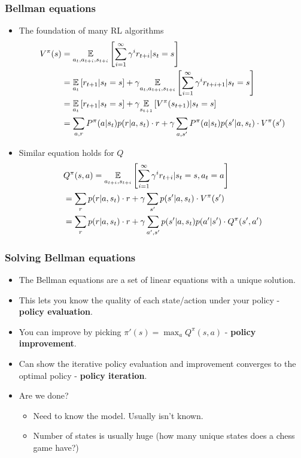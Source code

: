 \documentclass{beamer}
\renewcommand{\high}{\textbf}
\begin{document}
\begin{frame}\frametitle{Bellman equations}\small
\begin{itemize}
    \item The foundation of many RL algorithms
    {\footnotesize
    \begin{align*}\footnotesize
    V^\pi(s)&=\underset{a_{t},a_{t+i},s_{t+i}}{\mathbb{E}}\left[\sum_{i=1}^\infty\gamma^{i} r_{t+i} |s_t=s\right] \\
    &=\underset{a_{t}}{\mathbb{E}}\left[r_{t+1} |s_t=s\right]  +\gamma \underset{a_{t},a_{t+i},s_{t+i}}{\mathbb{E}}\left[\sum_{i=1}^\infty\gamma^{i} r_{t+i+1} |s_t=s\right] \\
    & = \underset{a_{t}}{\mathbb{E}}\left[r_{t+1} |s_t=s\right] +\gamma \underset{s_{t+1}}{\mathbb{E}}\left[V^{\pi}(s_{t+1})|s_t=s\right] \\
    & = \sum_{a,r}P^{\pi}(a|s_t)p(r|a,s_t)\cdot r+\gamma \sum_{a,s'}P^{\pi}(a|s_t)p(s'|a,s_t)\cdot V^{\pi}(s')
    \end{align*}}
    \item Similar equation holds for $Q$
        {\footnotesize
        \begin{align*}\footnotesize
        &Q^\pi(s,a)=\underset{a_{t+i},s_{t+i}}{\mathbb{E}}\left[\sum_{i=1}^\infty\gamma^{i} r_{t+i} |s_t=s,a_t=a\right] \\
        & = \sum_{r}p(r|a,s_t)\cdot r+ \gamma\sum_{s'}p(s'|a,s_t)\cdot V^{\pi}(s') \\
        &=\sum_{r}p(r|a,s_t)\cdot r+ \gamma\sum_{a',s'}p(s'|a,s_t)p(a'|s')\cdot Q^{\pi}(s',a')
        \end{align*}}
\end{itemize}
\end{frame}

\begin{frame}\frametitle{Solving Bellman equations}\small
\begin{itemize}
    \item The Bellman equations are a set of linear equations with a unique solution.
    \item This lets you know the quality of each state/action under your policy - \high{policy evaluation}.
    \item You can improve by picking $\pi'(s)=\max_a Q^{\pi}(s,a)$ - \high{policy improvement}.
    \item Can show the iterative policy evaluation and improvement converges to the optimal policy - \high{policy iteration}.
    \item Are we done? %
    \begin{itemize}
        \item Need to know the model. Usually isn't known.
        \item Number of states is usually huge (how many unique states does a chess game have?) 
    \end{itemize}
\end{itemize}
\end{frame}
\end{document}
